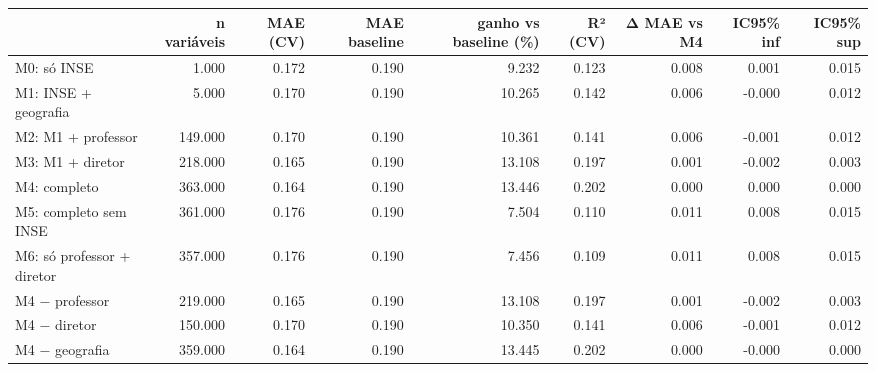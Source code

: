 \begin{tabular}{lrrrrrrrr}
\toprule
 & n variáveis & MAE (CV) & MAE baseline & ganho vs baseline (\%) & R² (CV) & Δ MAE vs M4 & IC95\% inf & IC95\% sup \\
\midrule
M0: só INSE & 1.000 & 0.172 & 0.190 & 9.232 & 0.123 & 0.008 & 0.001 & 0.015 \\
M1: INSE + geografia & 5.000 & 0.170 & 0.190 & 10.265 & 0.142 & 0.006 & -0.000 & 0.012 \\
M2: M1 + professor & 149.000 & 0.170 & 0.190 & 10.361 & 0.141 & 0.006 & -0.001 & 0.012 \\
M3: M1 + diretor & 218.000 & 0.165 & 0.190 & 13.108 & 0.197 & 0.001 & -0.002 & 0.003 \\
M4: completo & 363.000 & 0.164 & 0.190 & 13.446 & 0.202 & 0.000 & 0.000 & 0.000 \\
M5: completo sem INSE & 361.000 & 0.176 & 0.190 & 7.504 & 0.110 & 0.011 & 0.008 & 0.015 \\
M6: só professor + diretor & 357.000 & 0.176 & 0.190 & 7.456 & 0.109 & 0.011 & 0.008 & 0.015 \\
M4 − professor & 219.000 & 0.165 & 0.190 & 13.108 & 0.197 & 0.001 & -0.002 & 0.003 \\
M4 − diretor & 150.000 & 0.170 & 0.190 & 10.350 & 0.141 & 0.006 & -0.001 & 0.012 \\
M4 − geografia & 359.000 & 0.164 & 0.190 & 13.445 & 0.202 & 0.000 & -0.000 & 0.000 \\
\bottomrule
\end{tabular}
